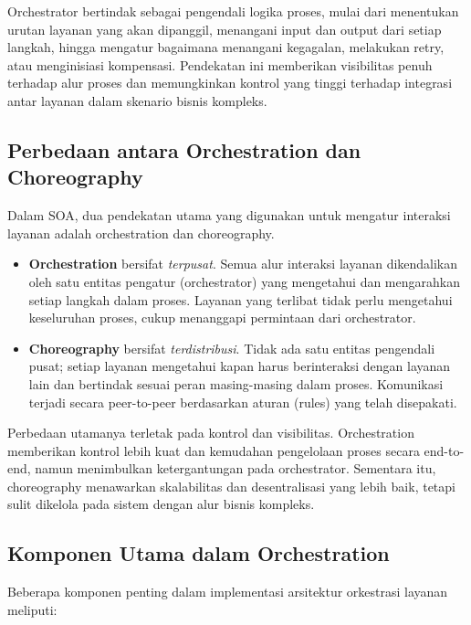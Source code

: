 Orchestrator bertindak sebagai pengendali logika proses, mulai dari menentukan urutan layanan yang akan dipanggil, menangani input dan output dari setiap langkah, hingga mengatur bagaimana menangani kegagalan, melakukan retry, atau menginisiasi kompensasi. Pendekatan ini memberikan visibilitas penuh terhadap alur proses dan memungkinkan kontrol yang tinggi terhadap integrasi antar layanan dalam skenario bisnis kompleks.

\subsection{Perbedaan antara Orchestration dan Choreography}

Dalam SOA, dua pendekatan utama yang digunakan untuk mengatur interaksi layanan adalah orchestration dan choreography.

\begin{itemize}
	\item \textbf{Orchestration} bersifat \textit{terpusat}. Semua alur interaksi layanan dikendalikan oleh satu entitas pengatur (orchestrator) yang mengetahui dan mengarahkan setiap langkah dalam proses. Layanan yang terlibat tidak perlu mengetahui keseluruhan proses, cukup menanggapi permintaan dari orchestrator.
	
	\item \textbf{Choreography} bersifat \textit{terdistribusi}. Tidak ada satu entitas pengendali pusat; setiap layanan mengetahui kapan harus berinteraksi dengan layanan lain dan bertindak sesuai peran masing-masing dalam proses. Komunikasi terjadi secara peer-to-peer berdasarkan aturan (rules) yang telah disepakati.
\end{itemize}

Perbedaan utamanya terletak pada kontrol dan visibilitas. Orchestration memberikan kontrol lebih kuat dan kemudahan pengelolaan proses secara end-to-end, namun menimbulkan ketergantungan pada orchestrator. Sementara itu, choreography menawarkan skalabilitas dan desentralisasi yang lebih baik, tetapi sulit dikelola pada sistem dengan alur bisnis kompleks.

\subsection{Komponen Utama dalam Orchestration}

Beberapa komponen penting dalam implementasi arsitektur orkestrasi layanan meliputi:

